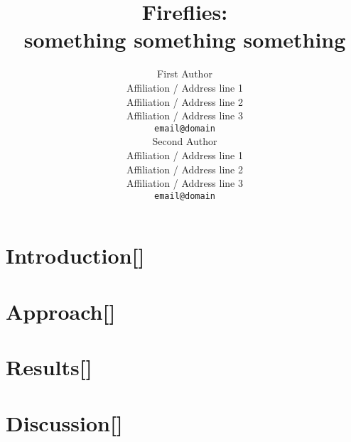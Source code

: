\documentclass[11pt,a4paper]{article}
\title{Fireflies: \\something something something}
\author{First Author \\
  Affiliation / Address line 1 \\
  Affiliation / Address line 2 \\
  Affiliation / Address line 3 \\
  {\tt email@domain} \\\And
  Second Author \\
  Affiliation / Address line 1 \\
  Affiliation / Address line 2 \\
  Affiliation / Address line 3 \\
  {\tt email@domain} \\}
\date{}
\renewcommand{\TODO}[1]{\colorbox{red!30}{[\textbf{#1}]}}
\newcommand{\includesection}[3]{\section{#2\TODO{#3}} \label{sec:#1} }
\begin{document}
\maketitle

%  


\includesection{intro      }{Introduction}{}
\includesection{approach   }{Approach}{}
\includesection{results}{Results}{}
\includesection{discussion }{Discussion}{}




\end{document}
